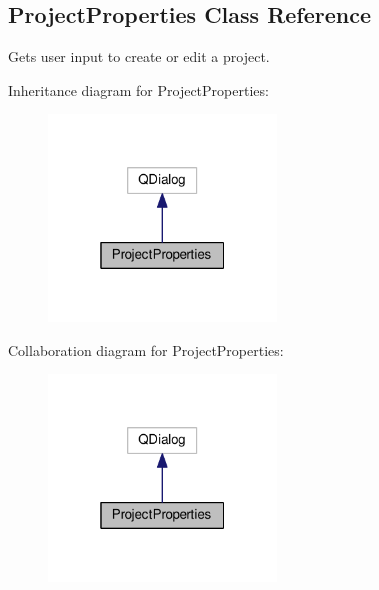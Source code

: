 \hypertarget{class_project_properties}{}\subsection{Project\+Properties Class Reference}
\label{class_project_properties}


Gets user input to create or edit a project.  




Inheritance diagram for Project\+Properties\+:
\nopagebreak
\begin{figure}[H]
\begin{center}
\leavevmode
\includegraphics[width=172pt]{class_project_properties__inherit__graph}
\end{center}
\end{figure}


Collaboration diagram for Project\+Properties\+:
\nopagebreak
\begin{figure}[H]
\begin{center}
\leavevmode
\includegraphics[width=172pt]{class_project_properties__coll__graph}
\end{center}
\end{figure}
